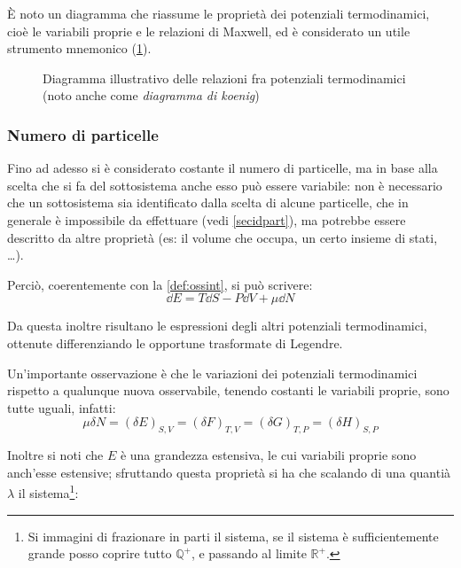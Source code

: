 \`E noto un diagramma che riassume le proprietà dei potenziali termodinamici, cioè le variabili proprie e le relazioni di Maxwell, ed è considerato un utile strumento mnemonico (\cref{fig:maxrel}).

\begin{figure}[t]
	\centering
	
	\caption{Diagramma illustrativo delle relazioni fra potenziali termodinamici (noto anche come \textit{diagramma di koenig})}
	\label{fig:maxrel}
\end{figure}

\subsubsection{Numero di particelle}
Fino ad adesso si è considerato costante il numero di particelle, ma in base alla scelta che si fa del sottosistema anche esso può essere variabile: non è necessario che un sottosistema sia identificato dalla scelta di alcune particelle, che in generale è impossibile da effettuare (vedi \cref{secidpart}), ma potrebbe essere descritto da altre proprietà (es: il volume che occupa, un certo insieme di stati, \dots).

Perciò, coerentemente con la \cref{def:ossint}, si può scrivere:
\begin{equation*}
\dd E = T \dd S - P \dd V + \mu \dd N
\end{equation*}

\noindent Da questa inoltre risultano le espressioni degli altri potenziali termodinamici, ottenute differenziando le opportune trasformate di Legendre.

\begin{note}
	Un'importante osservazione è che le variazioni dei potenziali termodinamici rispetto a qualunque nuova osservabile, tenendo costanti le variabili proprie, sono tutte uguali, infatti:
	\begin{equation*}
	\mu \delta N = (\delta E)_{S, V} = (\delta F)_{T,V} = (\delta G)_{T,P} = (\delta H)_{S,P}
	\end{equation*}
\end{note}

Inoltre si noti che $E$ è una grandezza estensiva, le cui variabili proprie sono anch'esse estensive; sfruttando questa proprietà si ha che scalando di una quantià $\lambda$ il sistema\footnote{Si immagini di frazionare in parti il sistema, se il sistema è sufficientemente grande posso coprire tutto $\mathbb{Q}^+$, e passando al limite $\mathbb{R}^+$.}:

